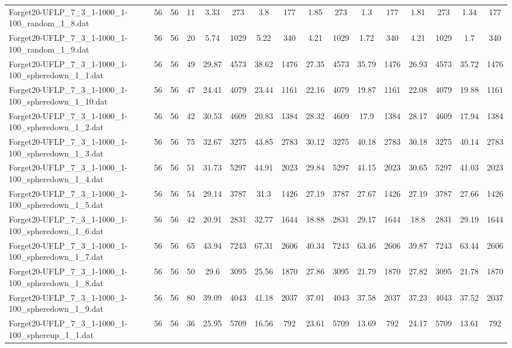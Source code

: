\begin{sidewaystable}[!ht]
{\begin{tabular}{lccccccccccccccc}
Forget20-UFLP\_7\_3\_1-1000\_1-100\_random\_1\_8.dat & 56 & 56 & 11 & 3.33 & 273 & 3.8 & 177 & 1.85 & 273 &  \textcolor{blue2}{1.3} & 177 & 1.81 & 273 & 1.34 & 177 \\
Forget20-UFLP\_7\_3\_1-1000\_1-100\_random\_1\_9.dat & 56 & 56 & 20 & 5.74 & 1029 & 5.22 & 340 & 4.21 & 1029 & 1.72 & 340 & 4.21 & 1029 & 1.7 & 340 \\
Forget20-UFLP\_7\_3\_1-1000\_1-100\_spheredown\_1\_1.dat & 56 & 56 & 49 & 29.87 & 4573 & 38.62 & 1476 & 27.35 & 4573 & 35.79 & 1476 &  \textcolor{blue2}{26.93} & 4573 & 35.72 & 1476 \\
Forget20-UFLP\_7\_3\_1-1000\_1-100\_spheredown\_1\_10.dat & 56 & 56 & 47 & 24.41 & 4079 & 23.44 & 1161 & 22.16 & 4079 & 19.87 & 1161 & 22.08 & 4079 & 19.88 & 1161 \\
Forget20-UFLP\_7\_3\_1-1000\_1-100\_spheredown\_1\_2.dat & 56 & 56 & 42 & 30.53 & 4609 & 20.83 & 1384 & 28.32 & 4609 &  \textcolor{blue2}{17.9} & 1384 & 28.17 & 4609 & 17.94 & 1384 \\
Forget20-UFLP\_7\_3\_1-1000\_1-100\_spheredown\_1\_3.dat & 56 & 56 & 75 & 32.67 & 3275 & 43.85 & 2783 &  \textcolor{blue2}{30.12} & 3275 & 40.18 & 2783 & 30.18 & 3275 & 40.14 & 2783 \\
Forget20-UFLP\_7\_3\_1-1000\_1-100\_spheredown\_1\_4.dat & 56 & 56 & 51 & 31.73 & 5297 & 44.91 & 2023 &  \textcolor{blue2}{29.84} & 5297 & 41.15 & 2023 & 30.65 & 5297 & 41.03 & 2023 \\
Forget20-UFLP\_7\_3\_1-1000\_1-100\_spheredown\_1\_5.dat & 56 & 56 & 54 & 29.14 & 3787 & 31.3 & 1426 & 27.19 & 3787 & 27.67 & 1426 & 27.19 & 3787 & 27.66 & 1426 \\
Forget20-UFLP\_7\_3\_1-1000\_1-100\_spheredown\_1\_6.dat & 56 & 56 & 42 & 20.91 & 2831 & 32.77 & 1644 & 18.88 & 2831 & 29.17 & 1644 &  \textcolor{blue2}{18.8} & 2831 & 29.19 & 1644 \\
Forget20-UFLP\_7\_3\_1-1000\_1-100\_spheredown\_1\_7.dat & 56 & 56 & 65 & 43.94 & 7243 & 67.31 & 2606 & 40.34 & 7243 & 63.46 & 2606 &  \textcolor{blue2}{39.87} & 7243 & 63.44 & 2606 \\
Forget20-UFLP\_7\_3\_1-1000\_1-100\_spheredown\_1\_8.dat & 56 & 56 & 50 & 29.6 & 3095 & 25.56 & 1870 & 27.86 & 3095 & 21.79 & 1870 & 27.82 & 3095 & 21.78 & 1870 \\
Forget20-UFLP\_7\_3\_1-1000\_1-100\_spheredown\_1\_9.dat & 56 & 56 & 80 & 39.09 & 4043 & 41.18 & 2037 & 37.01 & 4043 & 37.58 & 2037 & 37.23 & 4043 & 37.52 & 2037 \\
Forget20-UFLP\_7\_3\_1-1000\_1-100\_sphereup\_1\_1.dat & 56 & 56 & 36 & 25.95 & 5709 & 16.56 & 792 & 23.61 & 5709 & 13.69 & 792 & 24.17 & 5709 & 13.61 & 792 \\

\end{tabular}}
\end{sidewaystable}
